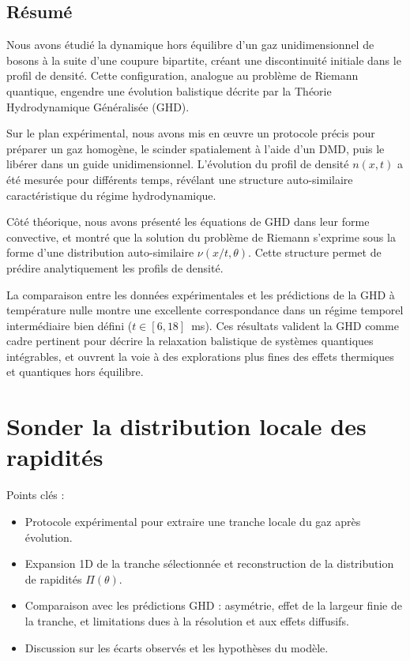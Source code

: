 \subsection*{Résumé}

Nous avons étudié la dynamique hors équilibre d’un gaz unidimensionnel de bosons à la suite d’une coupure bipartite, créant une discontinuité initiale dans le profil de densité. Cette configuration, analogue au problème de Riemann quantique, engendre une évolution balistique décrite par la Théorie Hydrodynamique Généralisée (GHD).

Sur le plan expérimental, nous avons mis en œuvre un protocole précis pour préparer un gaz homogène, le scinder spatialement à l’aide d’un DMD, puis le libérer dans un guide unidimensionnel. L’évolution du profil de densité $n(x,t)$ a été mesurée pour différents temps, révélant une structure auto-similaire caractéristique du régime hydrodynamique.

Côté théorique, nous avons présenté les équations de GHD dans leur forme convective, et montré que la solution du problème de Riemann s’exprime sous la forme d’une distribution auto-similaire $\nu(x/t, \theta)$. Cette structure permet de prédire analytiquement les profils de densité.

La comparaison entre les données expérimentales et les prédictions de la GHD à température nulle montre une excellente correspondance dans un régime temporel intermédiaire bien défini ($t \in [6,18]$~ms). Ces résultats valident la GHD comme cadre pertinent pour décrire la relaxation balistique de systèmes quantiques intégrables, et ouvrent la voie à des explorations plus fines des effets thermiques et quantiques hors équilibre.



\section{Sonder la distribution locale des rapidités}
\label{sec:local}

{\color{blue}
Points clés :
\begin{itemize}
	\item Protocole expérimental pour extraire une tranche locale du gaz après évolution.
	\item Expansion 1D de la tranche sélectionnée et reconstruction de la distribution de rapidités $\Pi(\theta)$.
	\item Comparaison avec les prédictions GHD : asymétrie, effet de la largeur finie de la tranche, et limitations dues à la résolution et aux effets diffusifs.
	\item Discussion sur les écarts observés et les hypothèses du modèle.
\end{itemize}

}


